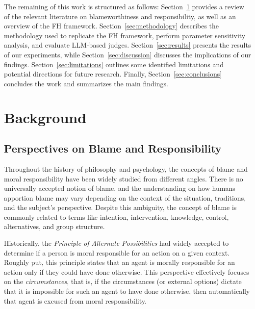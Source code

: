 \documentclass{article}
\begin{document}
The remaining of this work is structured as follows: Section~\ref{sec:background} provides a review of the relevant literature on blameworthiness and responsibility, as well as an overview of the FH framework. Section~\ref{sec:methodology} describes the methodology used to replicate the FH framework, perform parameter sensitivity analysis, and evaluate LLM-based judges. Section~\ref{sec:results} presents the results of our experiments, while Section~\ref{sec:discussion} discusses the implications of our findings. Section~\ref{sec:limitations} outlines some identified limitations and potential directions for future research. Finally, Section~\ref{sec:conclusions} concludes the work and summarizes the main findings.

\section{Background}\label{sec:background}

\subsection{Perspectives on Blame and Responsibility}


Throughout the history of philosophy and psychology, the concepts of blame and moral responsibility have been widely studied from different angles. There is no universally accepted notion of blame, and the understanding on how humans apportion blame may vary depending on the context of the situation, traditions, and the subject's perspective. Despite this ambiguity, the concept of blame is commonly related to terms like intention, intervention, knowledge, control, alternatives, and group structure.


Historically, the \textit{Principle of Alternate Possibilities} had widely accepted to determine if a person is moral responsible for an action on a given context. Roughly put, this principle states that an agent is morally responsible for an action only if they could have done otherwise. This perspective effectively focuses on the \textit{circumstances}, that is, if the circumstances (or external options) dictate that it is impossible for such an agent to have done otherwise, then automatically that agent is excused from moral responsibility.
\end{document}

